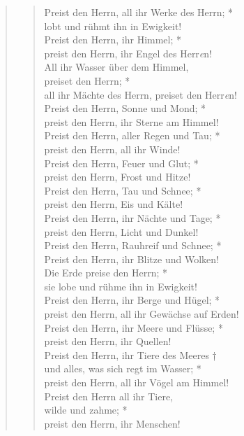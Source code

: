 \begin{quote}
\begin{verse}

Preist den Herrn, all ihr Werke des Herrn; *\\
lobt und rühmt ihn in Ewigkeit!\\
\vin Preist den Herrn, ihr Himmel; *\\
\vin preist den Herrn, ihr Engel des Herr\textit{e}n!\\
All ihr Wasser über dem Himmel,\\
preiset den Herrn; *\\
all ihr Mächte des Herrn, preiset den Herr\textit{e}n!\\
\vin Preist den Herrn, Sonne und Mond; *\\
\vin preist den Herrn, ihr Sterne am Himmel!\\
Preist den Herrn, aller Regen und Tau; *\\
preist den Herrn, all ihr Winde!\\
\vin Preist den Herrn, Feuer und Glut; *\\
\vin preist den Herrn, Frost und Hitze!\\
Preist den Herrn, Tau und Schnee; *\\
preist den Herrn, Eis und Kälte!\\
\vin Preist den Herrn, ihr Nächte und Tage; *\\
\vin preist den Herrn, Licht und Dunkel!\\
Preist den Herrn, Rauhreif und Schnee; *\\
Preist den Herrn, ihr Blitze und Wolken!\\
\vin Die Erde preise den Herrn; *\\
\vin sie lobe und rühme ihn in Ewigkeit!\\
Preist den Herrn, ihr Berge und Hügel; *\\
preist den Herrn, all ihr Gewächse auf Erden!\\
\vin Preist den Herrn, ihr Meere und Flüsse; *\\
\vin preist den Herrn, ihr Quellen!\\
Preist den Herrn, ihr Tiere des Meeres †\\
und alles, was sich regt im Wasser; *\\
preist den Herrn, all ihr Vögel am Himmel!\\
\vin Preist den Herrn all ihr Tiere,\\
\vin wilde und zahme; *\\
\vin preist den Herrn, ihr Menschen!\\

\end{verse}
\end{quote}
